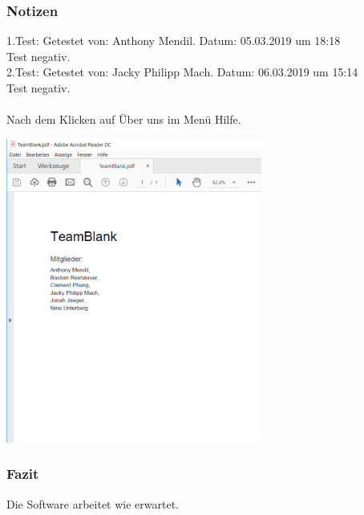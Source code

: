 \documentclass[enabledeprecatedfontcommands]{scrartcl}
\begin{document}
\subsubsection{Notizen}
1.Test: Getestet von: Anthony Mendil. Datum:  05.03.2019 um 18:18\\
Test negativ.\\
2.Test: Getestet von: Jacky Philipp Mach. Datum: 06.03.2019 um 15:14\\
Test negativ.\\\\
Nach dem Klicken auf Über uns im Menü Hilfe.
\begin{center}
\includegraphics[height=10cm]{aboutus.png}
\end{center}
\subsubsection{Fazit}
Die Software arbeitet wie erwartet.

\newpage
\end{document}
